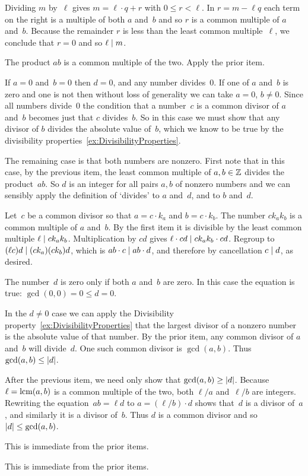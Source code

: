 \documentclass{ibl}
\begin{document}
\begin{euclidproof}
\begin{ex}
\begin{ans}
\begin{exes}
  Dividing $m$ by~$\ell$ gives 
  $m=\ell\cdot q+r$ with $0\leq r< \ell$.
  In $r=m-\ell q$ 
  each term on the right is a multiple
  of both $a$ and~$b$ and so 
  $r$ is a common multiple of $a$ and~$b$.
  Because the remainder $r$ is less than the least common multiple~$\ell$,
  we conclude that $r=0$ and so $\ell\mid m$.
\item The product $ab$ is a common multiple of the two.
  Apply the prior item.
\item If $a=0$ and~$b=0$ then $d=0$, and any number divides~$0$.
  If one of $a$ and~$b$ is zero and one is not then without loss of generality
  we can take $a=0$, $b\neq 0$.
  Since all numbers divide~$0$ the condition that a number~$c$ 
  is a common divisor of $a$ and~$b$
  becomes just that $c$ divides~$b$.
  So in this case we must show that any divisor of $b$ divides the 
  absolute value of~$b$, which we know to be true by the divisibility 
  properties~\ref{ex:DivisibilityProperties}.

  The remaining case is that both numbers are nonzero.
  First note that in this case,
  by the previous item, the least common multiple of $a,b\in\mathbb{Z}$ divides
  the product~$ab$.
  So $d$ is an integer for all pairs $a,b$ of nonzero numbers
  and we can sensibly apply the definition of `divides' to
  $a$ and~$d$, and to $b$ and~$d$.
  
  Let~$c$ be a common divisor so that $a=c\cdot k_a$ and $b=c\cdot k_b$.
  The number $ck_ak_b$ is a common multiple of $a$ and~$b$. 
  By the first item it is divisible by the least common multiple  
  $\ell\mid ck_ak_b$.
  Multiplication by $cd$ gives $\ell\cdot cd\mid ck_ak_b\cdot cd$.
  Regroup to $(\ell c)d\mid (ck_a)(ck_b)d$, which is
  $ab\cdot c\mid ab\cdot d$, and therefore by cancellation $c\mid d$,
  as desired.
\item The number~$d$ is zero only if both $a$ and~$b$ are
  zero.
  In this case the equation is true: $\gcd(0,0)=0\leq d=0$.

  In the $d\neq 0$ case we can apply the 
  Divisibility property~\ref{ex:DivisibilityProperties} that the
  largest divisor of a nonzero number is the absolute value of that number.
  By the prior item, any common divisor of $a$ and~$b$ will divide~$d$.
  One such common divisor is $\gcd(a,b)$.
  Thus $\gcd(a,b)\leq\lvert d\rvert$.
\item
  After the previous item, we need only show that $\gcd(a,b)\geq\lvert d\rvert$. 
  Because $\ell=\operatorname{lcm}(a,b)$ is a common multiple of the two, 
  both $\ell/a$ and~$\ell/b$ are integers. 
  Rewriting the equation~$ab=\ell d$ to 
  $a=(\ell/b)\cdot d$ shows that~$d$ is a divisor of~$a$, and similarly
  it is a divisor of~$b$.
  Thus $d$ is a common divisor and so $\lvert d\rvert\leq \gcd(a,b)$.
\item This is immediate from the prior items.
\item This is immediate from the prior items.
\end{exes}
\end{ans}
\end{ex}


\end{euclidproof}
\end{document}
